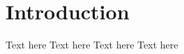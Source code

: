\begin{frame}[image]
    \titlepage
\end{frame}

\begin{frame}[image]
  \tableofcontents
\end{frame}


\section{Introduction}
  \begin{frame}[image]
    Text here
    Text here
    Text here
    Text here
  \end{frame}

